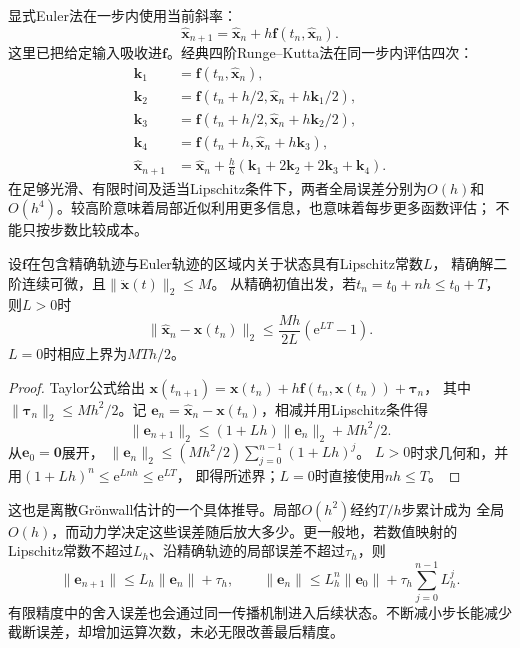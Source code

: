 显式Euler法在一步内使用当前斜率：
\begin{equation}
  \widehat{\bm x}_{n+1}
  =\widehat{\bm x}_n+h\bm f(t_n,\widehat{\bm x}_n).
  \label{eq:dynamical-forward-euler}
\end{equation}
这里已把给定输入吸收进$\bm f$。经典四阶Runge--Kutta法在同一步内评估四次：
\begin{align*}
  \bm k_1&=\bm f(t_n,\widehat{\bm x}_n),\\
  \bm k_2&=\bm f(t_n+h/2,\widehat{\bm x}_n+h\bm k_1/2),\\
  \bm k_3&=\bm f(t_n+h/2,\widehat{\bm x}_n+h\bm k_2/2),\\
  \bm k_4&=\bm f(t_n+h,\widehat{\bm x}_n+h\bm k_3),\\
  \widehat{\bm x}_{n+1}
    &=\widehat{\bm x}_n+\frac h6(\bm k_1+2\bm k_2+2\bm k_3+\bm k_4).
\end{align*}
在足够光滑、有限时间及适当Lipschitz条件下，两者全局误差分别为$O(h)$和
$O(h^4)$。较高阶意味着局部近似利用更多信息，也意味着每步更多函数评估；
不能只按步数比较成本。

\begin{theorem}[Euler法的有限时域全局误差]
  \label{thm:dynamical-euler-global-error}
  设$\bm f$在包含精确轨迹与Euler轨迹的区域内关于状态具有Lipschitz常数$L$，
  精确解二阶连续可微，且$\|\ddot{\bm x}(t)\|_2\leq M$。
  从精确初值出发，若$t_n=t_0+nh\leq t_0+T$，则$L>0$时
  \[
    \|\widehat{\bm x}_n-\bm x(t_n)\|_2
      \leq\frac{Mh}{2L}(\mathrm e^{LT}-1).
  \]
  $L=0$时相应上界为$MTh/2$。
\end{theorem}
\begin{proof}
  Taylor公式给出
  $\bm x(t_{n+1})=\bm x(t_n)+h\bm f(t_n,\bm x(t_n))+\bm\tau_n$，
  其中$\|\bm\tau_n\|_2\leq Mh^2/2$。记
  $\bm e_n=\widehat{\bm x}_n-\bm x(t_n)$，相减并用Lipschitz条件得
  \[
    \|\bm e_{n+1}\|_2\leq(1+Lh)\|\bm e_n\|_2+Mh^2/2.
  \]
  从$\bm e_0=\bm0$展开，
  $\|\bm e_n\|_2\leq(Mh^2/2)\sum_{j=0}^{n-1}(1+Lh)^j$。
  $L>0$时求几何和，并用$(1+Lh)^n\leq\mathrm e^{Lnh}\leq\mathrm e^{LT}$，
  即得所述界；$L=0$时直接使用$nh\leq T$。
\end{proof}
这也是离散Grönwall估计的一个具体推导。局部$O(h^2)$经约$T/h$步累计成为
全局$O(h)$，而动力学决定这些误差随后放大多少。更一般地，若数值映射的
Lipschitz常数不超过$L_h$、沿精确轨迹的局部误差不超过$\tau_h$，则
\[
  \|\bm e_{n+1}\|\leq L_h\|\bm e_n\|+\tau_h,\qquad
  \|\bm e_n\|\leq L_h^n\|\bm e_0\|+\tau_h\sum_{j=0}^{n-1}L_h^j.
\]
有限精度中的舍入误差也会通过同一传播机制进入后续状态。不断减小步长能减少
截断误差，却增加运算次数，未必无限改善最后精度。

